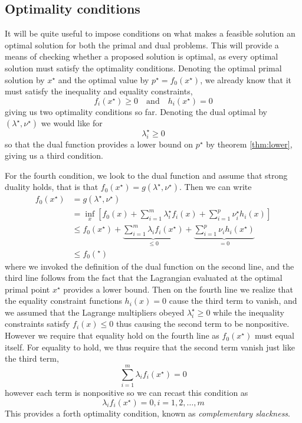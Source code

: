 \subsection{Optimality conditions} \label{ssec:KKT}
It will be quite useful to impose conditions on what makes a feasible solution an optimal solution for both the primal and dual problems. This will provide a means of checking whether a proposed solution is optimal, as every optimal solution must satisfy the optimality conditions. Denoting the optimal primal solution by $x^\star$ and the optimal value by $p^\star = f_0(x^\star)$, we already know that it must satisfy the inequality and equality constraints,
\begin{equation}
f_i(x^\star) \ge 0 \quad \mathrm{and} \quad h_i(x^\star) = 0
\end{equation}
giving us two optimality conditions so far. Denoting the dual optimal by $(\lambda^\star, \nu^\star)$ we would like for
\begin{equation}
\lambda_i^\star \ge 0
\end{equation}
so that the dual function provides a lower bound on $p^\star$ by theorem \ref{thm:lower}, giving us a third condition.

For the fourth condition, we look to the dual function and assume that strong duality holds, that is that $f_0(x^\star) = g(\lambda^\star, \nu^\star)$. Then we can write
\begin{align}
  f_0(x^\star) &= g(\lambda^\star, \nu^\star) \\
  & = \inf_x \left[ f_0(x) + \sum_{i=1}^m \lambda_i^\star f_i(x) + \sum_{i=1}^p \nu_i^\star h_i(x) \right] \\
  & \le f_0(x^\star)
    + \underbrace{\sum_{i=1}^m \lambda_i f_i(x^\star)}_{\le 0}
    + \underbrace{\sum_{i=1}^p \nu_i h_i(x^\star)}_{=0} \\
  & \le f_0(^\star)
\end{align}
where we invoked the definition of the dual function on the second line, and the third line follows from the fact that the Lagrangian evaluated at the optimal primal point $x^\star$ provides a lower bound. Then on the fourth line we realize that the equality constraint functions $h_i(x) = 0$ cause the third term to vanish, and we assumed that the Lagrange multipliers obeyed $\lambda_i^\star \ge 0$ while the inequality constraints satisfy $f_i(x) \le 0$ thus causing the second term to be nonpositive. However we require that equality hold on the fourth line as $f_0(x^\star)$ must equal itself. For equality to hold, we thus require that the second term vanish just like the third term,
\begin{equation}
  \sum_{i=1}^m \lambda_i f_i(x^\star) = 0
\end{equation}
however each term is nonpositive so we can recast this condition as
\begin{equation}
  \lambda_i f_i(x^\star) = 0, i = 1,2,\dots,m
\end{equation}
This provides a forth optimality condition, known as \emph{complementary slackness}.

